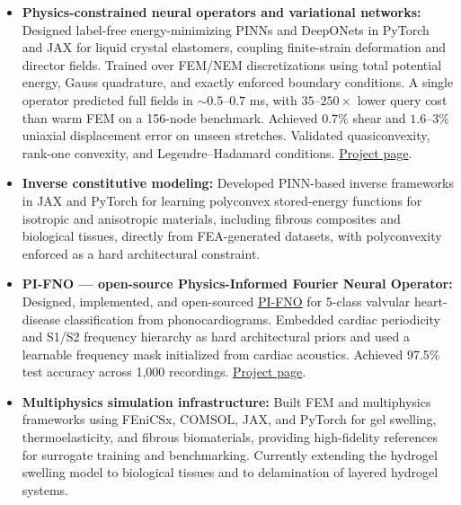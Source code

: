 \documentclass[10pt, letterpaper]{article}
\begin{document}
\begin{itemize}
\begin{itemize}[
  leftmargin=1.2em,
  itemsep=1pt,
  topsep=2pt,
  parsep=0pt,
  label=\textcolor{midgray}{\textendash}
]
\end{itemize}


\item \textbf{Physics-constrained neural operators and variational networks:}
Designed label-free energy-minimizing PINNs and DeepONets in PyTorch and JAX
for liquid crystal elastomers, coupling finite-strain deformation and director
fields. Trained over FEM/NEM discretizations using total potential energy,
Gauss quadrature, and exactly enforced boundary conditions. A single operator
predicted full fields in $\sim0.5$--$0.7$ ms, with $35$--$250\times$ lower
query cost than warm FEM on a 156-node benchmark. Achieved $0.7\%$ shear and
$1.6$--$3\%$ uniaxial displacement error on unseen stretches. Validated
quasiconvexity, rank-one convexity, and Legendre--Hadamard conditions.
\href{https://miladshirani.github.io/research-physics-enforced-operator-learning.html}
{Project page}.


\item \textbf{Inverse constitutive modeling:}
Developed PINN-based inverse frameworks in JAX and PyTorch for learning
polyconvex stored-energy functions for isotropic and anisotropic materials,
including fibrous composites and biological tissues, directly from FEA-generated
datasets, with polyconvexity enforced as a hard architectural constraint.


\item \textbf{PI-FNO --- open-source Physics-Informed Fourier Neural Operator:}
Designed, implemented, and open-sourced
\href{https://github.com/miladshirani/PI-FNO}{PI-FNO}
for 5-class valvular heart-disease classification from phonocardiograms.
Embedded cardiac periodicity and S1/S2 frequency hierarchy as hard architectural
priors and used a learnable frequency mask initialized from cardiac acoustics.
Achieved 97.5\% test accuracy across 1,000 recordings.
\href{https://miladshirani.github.io/research-pi-fno.html}
{Project page}.


\item \textbf{Multiphysics simulation infrastructure:}
Built FEM and multiphysics frameworks using FEniCSx, COMSOL, JAX, and PyTorch
for gel swelling, thermoelasticity, and fibrous biomaterials, providing
high-fidelity references for surrogate training and benchmarking. Currently
extending the hydrogel swelling model to biological tissues and to delamination
of layered hydrogel systems.


\end{itemize}
\end{document}
